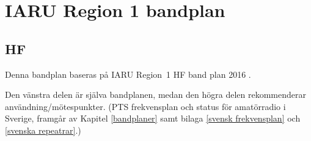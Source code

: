 \chapter{IARU Region 1 bandplan}
\label{IARU bandplan}

\section{HF}
\label{HFbandplan}

Denna bandplan baseras på IARU Region~1 HF band plan 2016 \cite{IARU1}.

Den vänstra delen är själva bandplanen, medan den högra delen rekommenderar
användning/mötespunkter.
(PTS frekvensplan och status för amatörradio i Sverige, framgår av Kapitel
\ref{bandplaner} samt bilaga \ref{svensk frekvensplan} och
\ref{svenska repeatrar}.)

